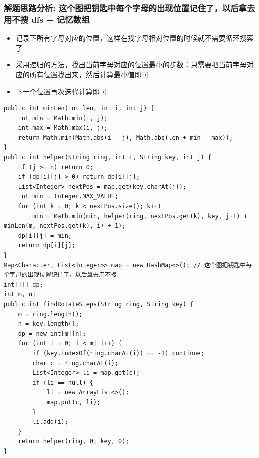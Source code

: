 \documentclass[9pt, b5paper]{article}
\begin{document}
\subsubsection{解题思路分析: 这个图把钥匙中每个字母的出现位置记住了，以后拿去用不搜 dfs + 记忆数组}
\label{sec-4-3-1}
\begin{itemize}
\item 记录下所有字母对应的位置，这样在找字母相对位置的时候就不需要循环搜索了
\item 采用递归的方法，找出当前字母对应的位置最小的步数：只需要把当前字母对应的所有位置找出来，然后计算最小值即可
\item 下一个位置再次迭代计算即可
\end{itemize}
\begin{verbatim}
public int minLen(int len, int i, int j) {
    int min = Math.min(i, j);
    int max = Math.max(i, j);
    return Math.min(Math.abs(i - j), Math.abs(len + min - max));
}
public int helper(String ring, int i, String key, int j) {
    if (j >= n) return 0;
    if (dp[i][j] > 0) return dp[i][j];
    List<Integer> nextPos = map.get(key.charAt(j));
    int min = Integer.MAX_VALUE;
    for (int k = 0; k < nextPos.size(); k++) 
        min = Math.min(min, helper(ring, nextPos.get(k), key, j+1) + minLen(m, nextPos.get(k), i) + 1);
    dp[i][j] = min;
    return dp[i][j];
}
Map<Character, List<Integer>> map = new HashMap<>(); // 这个图把钥匙中每个字母的出现位置记住了，以后拿去用不搜
int[][] dp;
int m, n;
public int findRotateSteps(String ring, String key) {
    m = ring.length();
    n = key.length();
    dp = new int[m][n];
    for (int i = 0; i < m; i++) {
        if (key.indexOf(ring.charAt(i)) == -1) continue;
        char c = ring.charAt(i);
        List<Integer> li = map.get(c);
        if (li == null) {
            li = new ArrayList<>();
            map.put(c, li);
        }
        li.add(i);
    }
    return helper(ring, 0, key, 0);
}
\end{verbatim}
\end{document}
